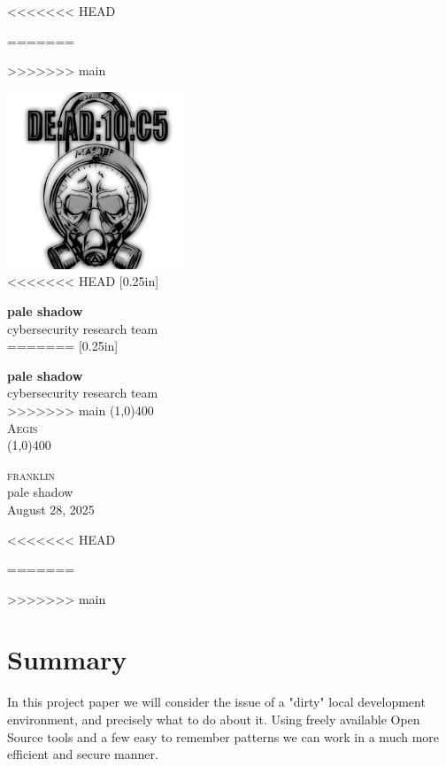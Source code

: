 \documentclass[11pt]{report}
\newcommand{\myTitle}{Aegis}
\newcommand{\myName}{franklin}
\newcommand{\myOrg}{pale shadow}
\newcommand{\myDate}{August 28, 2025}
\begin{document}
<<<<<<< HEAD

=======
	
>>>>>>> main
	\begin{titlepage}
		\begin{center}
			\includegraphics[scale=0.75]{../static/images/new_logo.jpeg}\\
<<<<<<< HEAD
			[0.25in]

			\textbf{\Large{\myOrg}}\\
			\Large{cybersecurity research team}\\
			[1in]

=======
			[0.25in] 
			
			\textbf{\Large{\myOrg}}\\
			\Large{cybersecurity research team}\\
			[1in]
			
>>>>>>> main
			\line(1,0){400}\\
			[2mm]
			\textsc{\Large{\myTitle}} \\
			\line(1,0){400} \\
			[1in]
		\end{center}
		\begin{center}
			\textsc{\Large \myName}	\\
			\myOrg\\
			[1in]
			\myDate
		\end{center}
	\end{titlepage}
<<<<<<< HEAD

=======
	
>>>>>>> main
	\section*{Summary}
    In this project paper we will consider the issue of a "dirty" local development
    environment, and precisely what to do about it. Using freely available
    Open Source tools and a few easy to remember patterns we can work in a
    much more efficient and secure manner.
\end{document}
